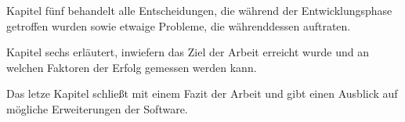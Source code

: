 \vspace{-2mm}

Kapitel fünf behandelt alle Entscheidungen, die während der Entwicklungsphase getroffen wurden sowie etwaige Probleme, die währenddessen auftraten.
\vspace{6mm}

\vspace{-2mm}

Kapitel sechs erläutert, inwiefern das Ziel der Arbeit erreicht wurde und an welchen Faktoren der Erfolg gemessen werden kann.
\vspace{6mm}

\vspace{-2mm}

Das letze Kapitel schließt mit einem Fazit der Arbeit und gibt einen Ausblick auf mögliche Erweiterungen der Software.